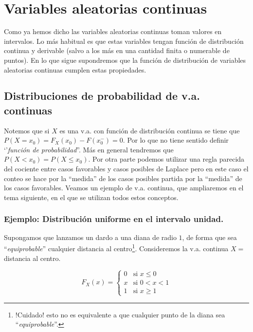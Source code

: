 \documentclass[handout]{beamer}\usepackage[]{graphicx}\usepackage[]{color}
\renewcommand{\leq}{\leqslant}
\renewcommand{\geq}{\geqslant}
\theoremstyle{plain}
\theoremstyle{definition}
\begin{document}
\section{Variables aleatorias continuas}
\begin{frame}

Como ya hemos dicho las variables aleatorias continuas toman valores en
intervalos.
Lo más habitual es que estas variables tengan función de distribución continua y
derivable (salvo  a los más en una cantidad finita o numerable de puntos). En lo que
sigue supondremos que la función de distribución de variables
aleatorias continuas cumplen estas propiedades.

\end{frame}
\subsection{Distribuciones de probabilidad de v.a. continuas}

\begin{frame}
Notemos que si $X$ es una v.a. con función de distribución continua se tiene que
$P(X=x_{0})=F_X(x_0)-F(x_0^{-})=0$. Por lo que no tiene sentido definir `'\textit{función de
probabilidad}''. Más en general tendremos que $P(X<x_0)=P(X\leq x_0)$.
Por otra parte podemos utilizar una regla parecida del
cociente entre casos favorables y casos posibles de Laplace  pero en
este caso el conteo se hace por la ``medida''  de los casos
posibles partida por la ``medida'' de los casos favorables.
Veamos un ejemplo de v.a. continua, que ampliaremos en el
tema siguiente, en el que se utilizan todos estos conceptos.
\end{frame}

\begin{frame}
\frametitle{Ejemplo: Distribución uniforme en el intervalo unidad.}

Supongamos que lanzamos un dardo a una diana de radio $1$, de forma que sea
``\textit{equiprobable}'' cualquier distancia al centro\footnote{!Cuidado! esto no es equivalente
a que cualquier punto de la diana  sea ``\textit{equiprobable}''.}.
Consideremos la v.a. continua $X=$distancia al centro.

$$F_{X}(x)=\left\{\begin{array}{ll}
0 & \mbox{si } x\leq 0\\
x & \mbox{si } 0<x<1\\
1 & \mbox{si } x\geq 1
\end{array}\right.$$
\end{frame}
\end{document}
